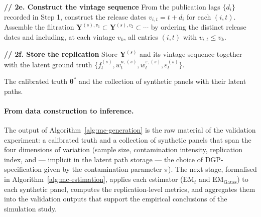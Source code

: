 \documentclass[11pt, a4paper, oneside]{article}
\newcommand{\mY}{\mathbf{Y}}
\begin{document}
\begin{algorithm}[H]
\begin{algorithmic}[1]
            \vspace{0.2em}
            \State \textbf{// 2e. Construct the vintage sequence}
            \State From the publication lags $\{d_i\}$ recorded in
                   Step 1, construct the release dates
                   $v_{i, t} = t + d_i$ for each $(i, t)$.
            \State Assemble the filtration
                   $\mathbf{Y}^{(s), v_1} \subset \mathbf{Y}^{(s), v_2} \subset \cdots$
                   by ordering the distinct release dates and
                   including, at each vintage $v_k$, all entries
                   $(i, t)$ with $v_{i, t} \leq v_k$.
            
            \vspace{0.2em}
            \State \textbf{// 2f. Store the replication}
            \State Store $\mY^{(s)}$ and its vintage sequence
                   together with the latent ground truth
                   $\{f_t^{(s)}, w_t^{u, (s)}, w_t^{\varepsilon, (s)}, \varepsilon_t^{(s)}\}$.
        \EndFor
    \EndFor
\EndFor

\vspace{0.3em}
\State \Return The calibrated truth $\boldsymbol{\theta}^*$ and the
        collection of synthetic panels with their latent paths.

\end{algorithmic}
\end{algorithm}

\paragraph{From data construction to inference.}
The output of Algorithm~\ref{alg:mc-generation} is the raw material
of the validation experiment: a calibrated truth and a collection of
synthetic panels that span the four dimensions of variation (sample
size, contamination intensity, replication index, and — implicit in
the latent path storage — the choice of DGP-specification given by
the contamination parameter $\pi$). The next stage, formalised in
Algorithm~\ref{alg:mc-estimation}, applies each estimator
($\mathrm{EM}_t$ and $\mathrm{EM}_{\mathrm{Gauss}}$) to each
synthetic panel, computes the replication-level metrics, and
aggregates them into the validation outputs that support the
empirical conclusions of the simulation study.
\end{document}
